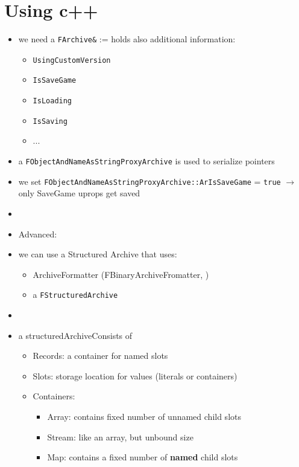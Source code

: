 \documentclass{scrbook}
\newcommand{\code}[1]{\colorbox{mygray}{\lstinline|#1|}}
\begin{document}
        \section{Using c++}
            \begin{itemize}
                \item we need a \code{FArchive&} := holds also additional information:
                \begin{itemize}
                    \item \code{UsingCustomVersion}
                    \item \code{IsSaveGame}
                    \item \code{IsLoading}
                    \item \code{IsSaving}
                    \item ...
                \end{itemize}
                \item a \code{FObjectAndNameAsStringProxyArchive} is used to serialize pointers
                \item we set \code{FObjectAndNameAsStringProxyArchive::ArIsSaveGame} = \code{true} $\rightarrow$ only SaveGame uprops get saved
                \item 
                \item Advanced:
                \item we can use a Structured Archive that uses:
                \begin{itemize}
                    \item ArchiveFormatter (FBinaryArchiveFromatter, )
                    \item a \code{FStructuredArchive}
                \end{itemize}
                \item
                \item a structuredArchiveConsists of
                \begin{itemize}
                    \item Records: a container for named slots
                    \item Slots: storage location for values (literals or containers)
                    \item Containers:
                    \begin{itemize}
                        \item Array: contains fixed number of unnamed child slots
                        \item Stream: like an array, but unbound size
                        \item Map: contains a fixed number  of \textbf{named} child slots
                    \end{itemize}
                \end{itemize}
            \end{itemize}
\end{document}
